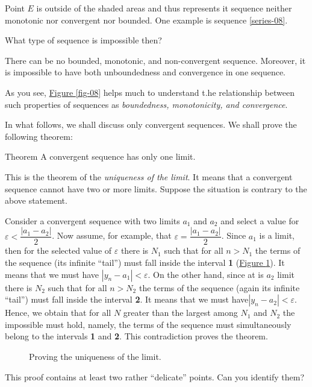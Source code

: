 {Point $E$ is outside of the shaded areas and thus represents it sequence neither monotonic nor convergent nor bounded. One example is sequence \eqref{series-08}.

\athr What type of sequence is impossible then?

\rdr There can be no bounded, monotonic, and non-convergent sequence. Moreover, it is impossible to have both unboundedness and convergence in one sequence.

\athr As you see, \hyperref[fig-08]{Figure \ref{fig-08}} helps much to understand t.he relationship between such properties of sequences as \emph{boundedness, monotonicity, and convergence}.

In what follows, we shall discuss only convergent sequences.	We shall prove	the	following theorem:
\begin{mytheo}{Theorem}
A convergent sequence has only one limit.
\end{mytheo}
This is the theorem of the \emph{uniqueness of the limit}. It means that a convergent sequence cannot have two or more limits. Suppose the situation is contrary to the above statement.

Consider a convergent sequence with two limits $a_{1}$ and $a_{2}$ and select a value for $\varepsilon < \dfrac{|a_{1} -a_{2}|}{2}$. Now assume, for
example, that $\varepsilon = \dfrac{|a_{1} -a_{2}|}{2}$. Since $a_{1}$ is a limit, then for the selected value of $\varepsilon$ there is $N_{1}$ such that for all $n > N_{1}$ the terms of the sequence (its infinite ``tail'') must fall inside
the interval \textbf{1} (\hyperref[fig-09]{Figure \ref{fig-09}}). It means that we must have $| y_{n}- a_{1} | < \varepsilon$. On the other hand, since at is $a_{2}$ limit there is $N_{2}$ such that for all $n > N_{2}$ the terms of the sequence (again its infinite ``tail'') must fall inside the interval \textbf{2}. It means that we must have$| y_{n}- a_{2}| < \varepsilon$. Hence, we obtain that for all $N$ greater than the largest among $N_{1}$ and $N_{2}$ the impossible must hold, namely, the terms of the sequence must simultaneously belong to the intervals \textbf{1} and \textbf{2}. This contradiction proves the theorem.
\begin{figure}[!ht]
\centering

\caption{Proving the uniqueness of the limit.}
\label{fig-09}
\end{figure}
This proof contains at least two rather ``delicate'' points. Can you identify them?

}
